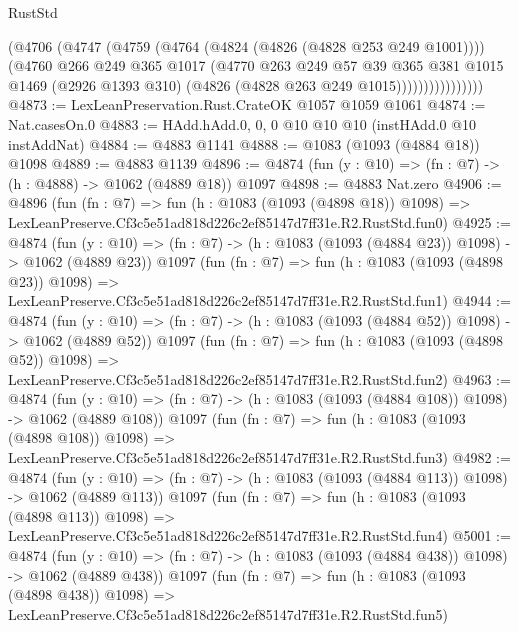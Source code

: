 \begin{lexlean}{RustStd}
\begin{coremodule}
                      (@4706
                        (@4747
                          (@4759
                            (@4764 (@4824 (@4826 (@4828 @253 @249 @1001))))
                            (@4760
                              @266
                              @249
                              @365
                              @1017
                              (@4770
                                @263
                                @249
                                @57
                                @39
                                @365
                                @381
                                @1015
                                @1469
                                (@2926 @1393 @310)
                                (@4826 (@4828 @263 @249 @1015))))))))))))))))
@4873 := LexLeanPreservation.Rust.CrateOK @1057 @1059 @1061
@4874 := Nat.casesOn.{0}
@4883 := HAdd.hAdd.{0, 0, 0} @10 @10 @10 (instHAdd.{0} @10 instAddNat)
@4884 := @4883 @1141
@4888 := @1083 (@1093 (@4884 @18)) @1098
@4889 := @4883 @1139
@4896 := @4874 (fun (y : @10) => (fn : @7) -> (h : @4888) -> @1062 (@4889 @18)) @1097
@4898 := @4883 Nat.zero
@4906 := @4896
    (fun (fn : @7) =>
    fun (h : @1083 (@1093 (@4898 @18)) @1098) =>
    LexLeanPreserve.Cf3c5e51ad818d226c2ef85147d7ff31e.R2.RustStd.fun0)
@4925 := @4874
    (fun (y : @10) => (fn : @7) -> (h : @1083 (@1093 (@4884 @23)) @1098) -> @1062 (@4889 @23))
    @1097
    (fun (fn : @7) =>
    fun (h : @1083 (@1093 (@4898 @23)) @1098) =>
    LexLeanPreserve.Cf3c5e51ad818d226c2ef85147d7ff31e.R2.RustStd.fun1)
@4944 := @4874
    (fun (y : @10) => (fn : @7) -> (h : @1083 (@1093 (@4884 @52)) @1098) -> @1062 (@4889 @52))
    @1097
    (fun (fn : @7) =>
    fun (h : @1083 (@1093 (@4898 @52)) @1098) =>
    LexLeanPreserve.Cf3c5e51ad818d226c2ef85147d7ff31e.R2.RustStd.fun2)
@4963 := @4874
    (fun (y : @10) => (fn : @7) -> (h : @1083 (@1093 (@4884 @108)) @1098) -> @1062 (@4889 @108))
    @1097
    (fun (fn : @7) =>
    fun (h : @1083 (@1093 (@4898 @108)) @1098) =>
    LexLeanPreserve.Cf3c5e51ad818d226c2ef85147d7ff31e.R2.RustStd.fun3)
@4982 := @4874
    (fun (y : @10) => (fn : @7) -> (h : @1083 (@1093 (@4884 @113)) @1098) -> @1062 (@4889 @113))
    @1097
    (fun (fn : @7) =>
    fun (h : @1083 (@1093 (@4898 @113)) @1098) =>
    LexLeanPreserve.Cf3c5e51ad818d226c2ef85147d7ff31e.R2.RustStd.fun4)
@5001 := @4874
    (fun (y : @10) => (fn : @7) -> (h : @1083 (@1093 (@4884 @438)) @1098) -> @1062 (@4889 @438))
    @1097
    (fun (fn : @7) =>
    fun (h : @1083 (@1093 (@4898 @438)) @1098) =>
    LexLeanPreserve.Cf3c5e51ad818d226c2ef85147d7ff31e.R2.RustStd.fun5)

\end{coremodule}
\end{lexlean}

